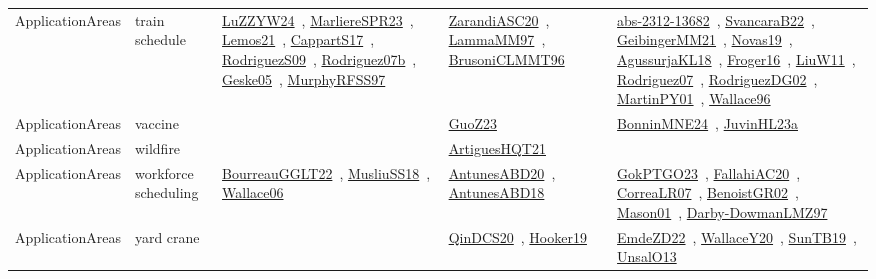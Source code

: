 {\begin{longtable}{lp{3cm}>{\raggedright\arraybackslash}p{6cm}>{\raggedright\arraybackslash}p{6cm}>{\raggedright\arraybackslash}p{8cm}}
ApplicationAreas & train schedule & \href{../works/LuZZYW24.pdf}{LuZZYW24}~\cite{LuZZYW24}, \href{../works/MarliereSPR23.pdf}{MarliereSPR23}~\cite{MarliereSPR23}, \href{../works/Lemos21.pdf}{Lemos21}~\cite{Lemos21}, \href{../works/CappartS17.pdf}{CappartS17}~\cite{CappartS17}, \href{../works/RodriguezS09.pdf}{RodriguezS09}~\cite{RodriguezS09}, \href{../works/Rodriguez07b.pdf}{Rodriguez07b}~\cite{Rodriguez07b}, \href{../works/Geske05.pdf}{Geske05}~\cite{Geske05}, \href{../works/MurphyRFSS97.pdf}{MurphyRFSS97}~\cite{MurphyRFSS97} & \href{../works/ZarandiASC20.pdf}{ZarandiASC20}~\cite{ZarandiASC20}, \href{../works/LammaMM97.pdf}{LammaMM97}~\cite{LammaMM97}, \href{../works/BrusoniCLMMT96.pdf}{BrusoniCLMMT96}~\cite{BrusoniCLMMT96} & \href{../works/abs-2312-13682.pdf}{abs-2312-13682}~\cite{abs-2312-13682}, \href{../works/SvancaraB22.pdf}{SvancaraB22}~\cite{SvancaraB22}, \href{../works/GeibingerMM21.pdf}{GeibingerMM21}~\cite{GeibingerMM21}, \href{../works/Novas19.pdf}{Novas19}~\cite{Novas19}, \href{../works/AgussurjaKL18.pdf}{AgussurjaKL18}~\cite{AgussurjaKL18}, \href{../works/Froger16.pdf}{Froger16}~\cite{Froger16}, \href{../works/LiuW11.pdf}{LiuW11}~\cite{LiuW11}, \href{../works/Rodriguez07.pdf}{Rodriguez07}~\cite{Rodriguez07}, \href{../works/RodriguezDG02.pdf}{RodriguezDG02}~\cite{RodriguezDG02}, \href{../works/MartinPY01.pdf}{MartinPY01}~\cite{MartinPY01}, \href{../works/Wallace96.pdf}{Wallace96}~\cite{Wallace96}\\
ApplicationAreas & vaccine &  & \href{../works/GuoZ23.pdf}{GuoZ23}~\cite{GuoZ23} & \href{../works/BonninMNE24.pdf}{BonninMNE24}~\cite{BonninMNE24}, \href{../works/JuvinHL23a.pdf}{JuvinHL23a}~\cite{JuvinHL23a}\\
ApplicationAreas & wildfire &  & \href{../works/ArtiguesHQT21.pdf}{ArtiguesHQT21}~\cite{ArtiguesHQT21} & \\
ApplicationAreas & workforce scheduling & \href{../works/BourreauGGLT22.pdf}{BourreauGGLT22}~\cite{BourreauGGLT22}, \href{../works/MusliuSS18.pdf}{MusliuSS18}~\cite{MusliuSS18}, \href{../works/Wallace06.pdf}{Wallace06}~\cite{Wallace06} & \href{../works/AntunesABD20.pdf}{AntunesABD20}~\cite{AntunesABD20}, \href{../works/AntunesABD18.pdf}{AntunesABD18}~\cite{AntunesABD18} & \href{../works/GokPTGO23.pdf}{GokPTGO23}~\cite{GokPTGO23}, \href{../works/FallahiAC20.pdf}{FallahiAC20}~\cite{FallahiAC20}, \href{../works/CorreaLR07.pdf}{CorreaLR07}~\cite{CorreaLR07}, \href{../works/BenoistGR02.pdf}{BenoistGR02}~\cite{BenoistGR02}, \href{../works/Mason01.pdf}{Mason01}~\cite{Mason01}, \href{../works/Darby-DowmanLMZ97.pdf}{Darby-DowmanLMZ97}~\cite{Darby-DowmanLMZ97}\\
ApplicationAreas & yard crane &  & \href{../works/QinDCS20.pdf}{QinDCS20}~\cite{QinDCS20}, \href{../works/Hooker19.pdf}{Hooker19}~\cite{Hooker19} & \href{../works/EmdeZD22.pdf}{EmdeZD22}~\cite{EmdeZD22}, \href{../works/WallaceY20.pdf}{WallaceY20}~\cite{WallaceY20}, \href{../works/SunTB19.pdf}{SunTB19}~\cite{SunTB19}, \href{../works/UnsalO13.pdf}{UnsalO13}~\cite{UnsalO13}\\
\end{longtable}
}


